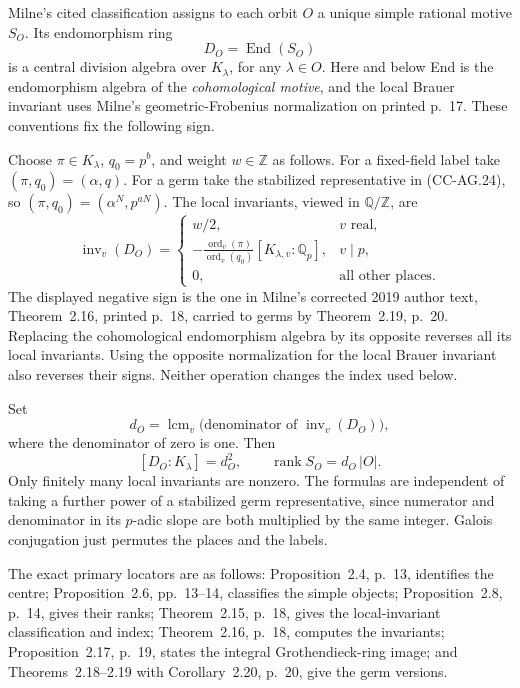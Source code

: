 \documentclass[11pt,a4paper]{article}
\theoremstyle{definition}\newtheorem{definition}[theorem]{Definition}
\theoremstyle{remark}\newtheorem{remark}[theorem]{Remark}
\begin{document}
Milne's cited classification assigns to each orbit \(O\) a
unique simple rational motive \(S_O\).  Its endomorphism ring
\[
           D_O=\operatorname{End}(S_O)
\]
is a central division algebra over \(K_\lambda\), for any
\(\lambda\in O\).  Here and below End is the endomorphism
algebra of the \emph{cohomological motive}, and the local
Brauer invariant uses Milne's geometric-Frobenius
normalization on printed p.~17.  These conventions fix
the following sign.

Choose \(\pi\in K_\lambda\), \(q_0=p^b\), and weight
\(w\in\mathbb Z\) as follows.  For a fixed-field label take
\((\pi,q_0)=(\alpha,q)\).  For a germ take the stabilized
representative in (CC-AG.24), so
\((\pi,q_0)=(\alpha^N,p^{aN})\).
The local invariants, viewed in \(\mathbb Q/\mathbb Z\), are
\[
 \operatorname{inv}_v(D_O)=
 \begin{cases}
   w/2,&v\text{ real},\\[2pt]
   -\displaystyle\frac{\operatorname{ord}_v(\pi)}
                         {\operatorname{ord}_v(q_0)}
        [K_{\lambda,v}:\mathbb Q_p],&v\mid p,\\[7pt]
   0,&\text{all other places}.
 \end{cases}                                                \tag{CC-AG.25}
\]
The displayed negative sign is the one in Milne's corrected
2019 author text, Theorem~2.16, printed p.~18, carried to
germs by Theorem~2.19, p.~20.  Replacing the cohomological
endomorphism algebra by its opposite reverses all its local
invariants.  Using the opposite normalization for the local
Brauer invariant also reverses their signs.  Neither
operation changes the index used below.

Set
\[
        d_O=\operatorname{lcm}_{v}
            \bigl(\text{denominator of }
                        \operatorname{inv}_v(D_O)\bigr),
                                                               \tag{CC-AG.26}
\]
where the denominator of zero is one.  Then
\[
        [D_O:K_\lambda]=d_O^2,\qquad
        \operatorname{rank}S_O=d_O\,|O|.                       \tag{CC-AG.27}
\]
Only finitely many local invariants are nonzero.
The formulas are independent of taking a further power of a
stabilized germ representative, since numerator and denominator
in its \(p\)-adic slope are both multiplied by the same integer.
Galois conjugation just permutes the places and the labels.

The exact primary locators are as follows: Proposition~2.4,
p.~13, identifies the centre; Proposition~2.6, pp.~13--14,
classifies the simple objects; Proposition~2.8, p.~14, gives
their ranks; Theorem~2.15, p.~18, gives the local-invariant
classification and index; Theorem~2.16, p.~18, computes
the invariants; Proposition~2.17, p.~19, states the integral
Grothendieck-ring image; and Theorems~2.18--2.19 with
Corollary~2.20, p.~20, give the germ versions.
\end{document}
